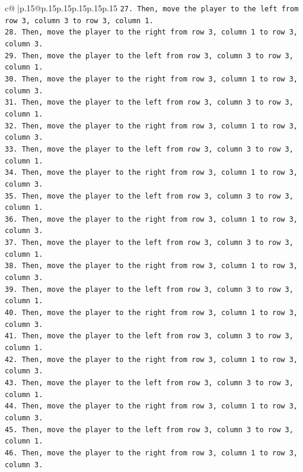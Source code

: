 \documentclass{article}
\begin{document}
{\begin{supertabular}{c@{$\;$}|p{.15\linewidth}@{}p{.15\linewidth}p{.15\linewidth}p{.15\linewidth}p{.15\linewidth}p{.15\linewidth}}
{{{\texttt{27. Then, move the player to the left from row 3, column 3 to row 3, column 1.} \\
\texttt{28. Then, move the player to the right from row 3, column 1 to row 3, column 3.} \\
\texttt{29. Then, move the player to the left from row 3, column 3 to row 3, column 1.} \\
\texttt{30. Then, move the player to the right from row 3, column 1 to row 3, column 3.} \\
\texttt{31. Then, move the player to the left from row 3, column 3 to row 3, column 1.} \\
\texttt{32. Then, move the player to the right from row 3, column 1 to row 3, column 3.} \\
\texttt{33. Then, move the player to the left from row 3, column 3 to row 3, column 1.} \\
\texttt{34. Then, move the player to the right from row 3, column 1 to row 3, column 3.} \\
\texttt{35. Then, move the player to the left from row 3, column 3 to row 3, column 1.} \\
\texttt{36. Then, move the player to the right from row 3, column 1 to row 3, column 3.} \\
\texttt{37. Then, move the player to the left from row 3, column 3 to row 3, column 1.} \\
\texttt{38. Then, move the player to the right from row 3, column 1 to row 3, column 3.} \\
\texttt{39. Then, move the player to the left from row 3, column 3 to row 3, column 1.} \\
\texttt{40. Then, move the player to the right from row 3, column 1 to row 3, column 3.} \\
\texttt{41. Then, move the player to the left from row 3, column 3 to row 3, column 1.} \\
\texttt{42. Then, move the player to the right from row 3, column 1 to row 3, column 3.} \\
\texttt{43. Then, move the player to the left from row 3, column 3 to row 3, column 1.} \\
\texttt{44. Then, move the player to the right from row 3, column 1 to row 3, column 3.} \\
\texttt{45. Then, move the player to the left from row 3, column 3 to row 3, column 1.} \\
\texttt{46. Then, move the player to the right from row 3, column 1 to row 3, column 3.} \\
}}}
\end{supertabular}}
\end{document}
